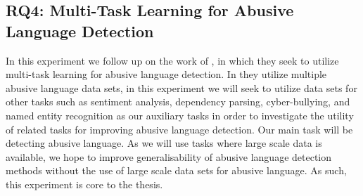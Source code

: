 %
%
%

\subsection{RQ4: Multi-Task Learning for Abusive Language Detection}\label{sub:mtl}
In this experiment we follow up on the work of \cite{Waseem:2018}, in which they seek to utilize multi-task learning for abusive language detection. In \cite{Waseem:2018} they utilize multiple abusive language data sets, in this experiment we will seek to utilize data sets for other tasks such as sentiment analysis, dependency parsing, cyber-bullying, and named entity recognition as our auxiliary tasks in order to investigate the utility of related tasks for improving abusive language detection. Our main task will be detecting abusive language. As we will use tasks where large scale data is available, we hope to improve generalisability of abusive language detection methods without the use of large scale data sets for abusive language. As such, this experiment is core to the thesis.

